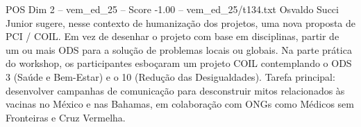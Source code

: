 \begin{textsample}{POS Dim 2 – vem\_ed\_25 – Score -1.00 – vem\_ed\_25/t134.txt}
Osvaldo Succi Junior sugere, nesse contexto de humanização dos projetos, uma nova proposta de PCI / COIL.
Em vez de desenhar o projeto com base em disciplinas, partir de um ou mais ODS para a solução de problemas locais ou globais.
Na parte prática do workshop, os participantes esboçaram um projeto COIL contemplando o ODS 3 (Saúde e Bem-Estar) e o 10 (Redução das Desigualdades).
Tarefa principal: desenvolver campanhas de comunicação para desconstruir mitos relacionados às vacinas no México e nas Bahamas, em colaboração com ONGs como Médicos sem Fronteiras e Cruz Vermelha.

\end{textsample}
